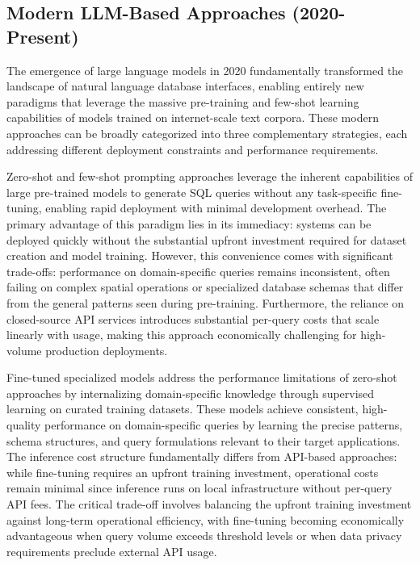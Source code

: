 \subsection{Modern LLM-Based Approaches (2020-Present)}

The emergence of large language models in 2020 fundamentally transformed the landscape of natural language database interfaces, enabling entirely new paradigms that leverage the massive pre-training and few-shot learning capabilities of models trained on internet-scale text corpora. These modern approaches can be broadly categorized into three complementary strategies, each addressing different deployment constraints and performance requirements.

Zero-shot and few-shot prompting approaches leverage the inherent capabilities of large pre-trained models to generate SQL queries without any task-specific fine-tuning, enabling rapid deployment with minimal development overhead. The primary advantage of this paradigm lies in its immediacy: systems can be deployed quickly without the substantial upfront investment required for dataset creation and model training. However, this convenience comes with significant trade-offs: performance on domain-specific queries remains inconsistent, often failing on complex spatial operations or specialized database schemas that differ from the general patterns seen during pre-training. Furthermore, the reliance on closed-source API services introduces substantial per-query costs that scale linearly with usage, making this approach economically challenging for high-volume production deployments.

Fine-tuned specialized models address the performance limitations of zero-shot approaches by internalizing domain-specific knowledge through supervised learning on curated training datasets. These models achieve consistent, high-quality performance on domain-specific queries by learning the precise patterns, schema structures, and query formulations relevant to their target applications. The inference cost structure fundamentally differs from API-based approaches: while fine-tuning requires an upfront training investment, operational costs remain minimal since inference runs on local infrastructure without per-query API fees. The critical trade-off involves balancing the upfront training investment against long-term operational efficiency, with fine-tuning becoming economically advantageous when query volume exceeds threshold levels or when data privacy requirements preclude external API usage.

